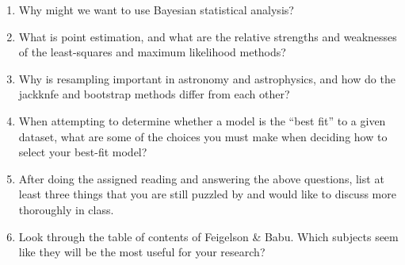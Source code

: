 \documentclass[10pt]{article}
\begin{document}
\begin{enumerate}

\item Why might we want to use Bayesian statistical analysis?

\item What is point estimation, and what are the relative strengths
  and weaknesses of the least-squares and maximum likelihood methods?

\item Why is resampling important in astronomy and astrophysics, and
  how do the jackknfe and bootstrap methods differ from each other? 

\item When attempting to determine whether a model is the ``best fit''
  to a given dataset, what are some of the choices you must
  make when deciding how to select your best-fit model?

\item After doing the assigned reading and answering the above
  questions, list at least three things that you are still puzzled by
  and would like to discuss more thoroughly in class.

\item Look through the table of contents of Feigelson \& Babu.  Which subjects
  seem like they will be the most useful for your research?  

\end{enumerate}
\end{document}
